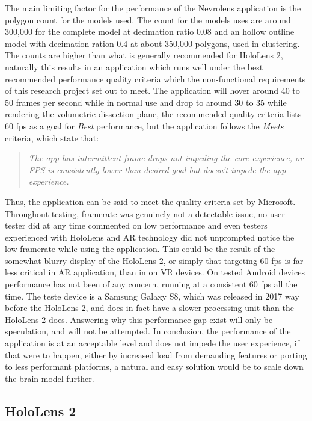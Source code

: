 The main limiting factor for the performance of the Nevrolens application is the polygon count for the models used. The count for the models uses are around 300,000 for the complete model at decimation ratio 0.08 and an hollow outline model with decimation ration 0.4 at about 350,000 polygons, used in clustering. The counts are higher than what is generally recommended for HoloLens 2, naturally this results in an application which runs well under the best recommended performance quality criteria which the non-functional requirements of this research project set out to meet. The application will hover around 40 to 50 frames per second while in normal use and drop to around 30 to 35 while rendering the volumetric dissection plane, the recommended quality criteria lists 60 fps as a goal for \textit{Best} performance, but the application follows the \textit{Meets} criteria, which state that:
\begin{quote}
\textit{The app has intermittent frame drops not impeding the core experience, or FPS is consistently lower than desired goal but doesn’t impede the app experience.}
\end{quote}
Thus, the application can be said to meet the quality criteria set by Microsoft. 
Throughout testing, framerate was genuinely not a detectable issue, no user tester did at any time commented on low performance and even testers experienced with HoloLens and AR technology did not unprompted notice the low framerate while using the application. This could be the result of the somewhat blurry display of the HoloLens 2, or simply that targeting 60 fps is far less critical in AR application, than in on VR devices. 
On tested Android devices performance has not been of any concern, running at a consistent 60 fps all the time. The teste device is a Samsung Galaxy S8, which was released in 2017 way before the HoloLens 2, and does in fact have a slower processing unit than the HoloLens 2 does. Answering why this performance gap exist will only be speculation, and will not be attempted.
In conclusion, the performance of the application is at an acceptable level and does not impede the user experience, if that were to happen, either by increased load from demanding features or porting to less performant platforms, a natural and easy solution would be to scale down the brain model further.


\subsection{HoloLens 2}

